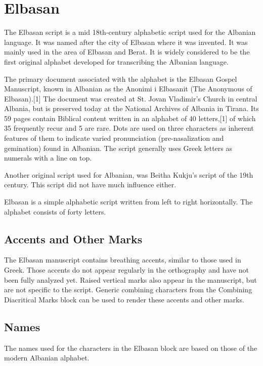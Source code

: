 \section{Elbasan}

\newfontfamily{}
The Elbasan script is a mid 18th-century alphabetic script used for the Albanian language. It was named after the city of Elbasan where it was invented. It was mainly used in the area of Elbasan and Berat. It is widely considered to be the first original alphabet developed for transcribing the Albanian language.

The primary document associated with the alphabet is the Elbasan Gospel Manuscript, known in Albanian as the Anonimi i Elbasanit (The Anonymous of Elbasan).[1] The document was created at St. Jovan Vladimir's Church in central Albania, but is preserved today at the National Archives of Albania in Tirana. Its 59 pages contain Biblical content written in an alphabet of 40 letters,[1] of which 35 frequently recur and 5 are rare. Dots are used on three characters as inherent features of them to indicate varied pronunciation (pre-nasalization and gemination) found in Albanian. The script generally uses Greek letters as numerals with a line on top.

Another original script used for Albanian, was Beitha Kukju's script of the 19th century. This script did not have much influence either.

Elbasan is a simple alphabetic script written from left to right horizontally. The alphabet consists of forty letters.

\subsection{Accents and Other Marks}

The Elbasan manuscript contains breathing accents, similar to
those used in Greek. Those accents do not appear regularly in the orthography and have
not been fully analyzed yet. Raised vertical marks also appear in the manuscript, but are
not specific to the script. Generic combining characters from the Combining Diacritical
Marks block can be used to render these accents and other marks.

\subsection{Names}

The names used for the characters in the Elbasan block are based on those of the
modern Albanian alphabet.

